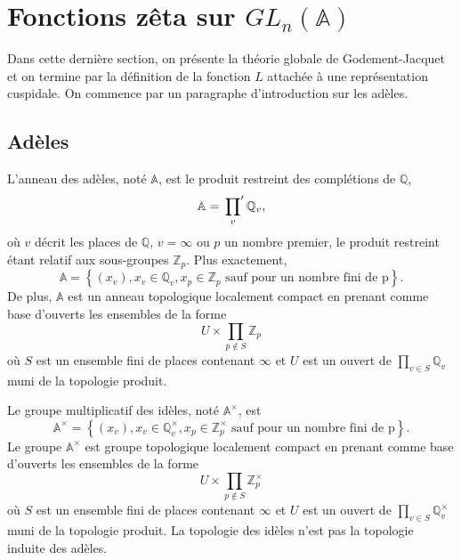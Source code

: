 \section{Fonctions zêta sur $GL_n(\mathbb{A})$}

Dans cette dernière section, on présente la théorie globale de Godement-Jacquet \cite{godement-jacquet} et on termine par la définition de la fonction $L$ attachée à une représentation cuspidale. On commence par un paragraphe d'introduction sur les adèles.

\subsection{Adèles}

L'anneau des adèles, noté $\mathbb{A}$, est le produit restreint des complétions de $\mathbb{Q}$,
\begin{equation}
\mathbb{A} = \sideset{}{'}\prod_v \mathbb{Q}_v,
\end{equation}
où $v$ décrit les places de $\mathbb{Q}$, $v = \infty$ ou $p$ un nombre premier, le produit restreint étant relatif aux sous-groupes $\mathbb{Z}_p$. Plus exactement,
\begin{equation}
\mathbb{A} = \left\lbrace (x_v), x_v \in \mathbb{Q}_v, x_p \in \mathbb{Z}_p \text{ sauf pour un nombre fini de p} \right\rbrace.
\end{equation}
De plus, $\mathbb{A}$ est un anneau topologique localement compact en prenant comme base d'ouverts les ensembles de la forme
\begin{equation}
U \times \prod_{p \not\in S} \mathbb{Z}_p
\end{equation}
où $S$ est un ensemble fini de places contenant $\infty$ et $U$ est un ouvert de $\prod_{v \in S} \mathbb{Q}_v$ muni de la topologie produit.

Le groupe multiplicatif des idèles, noté $\mathbb{A}^\times$, est
\begin{equation}
\mathbb{A}^\times = \left\lbrace (x_v), x_v \in \mathbb{Q}_v^\times, x_p \in \mathbb{Z}_p^\times \text{ sauf pour un nombre fini de p} \right\rbrace.
\end{equation}
Le groupe $\mathbb{A}^\times$ est groupe topologique localement compact en prenant comme base d'ouverts les ensembles de la forme
\begin{equation}
U \times \prod_{p \not\in S} \mathbb{Z}_p^\times
\end{equation}
où $S$ est un ensemble fini de places contenant $\infty$ et $U$ est un ouvert de $\prod_{v \in S} \mathbb{Q}_v^\times$ muni de la topologie produit. La topologie des idèles n'est pas la topologie induite des adèles.

